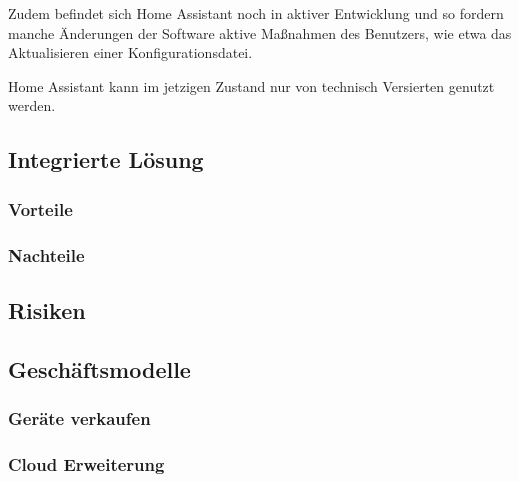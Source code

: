 Zudem befindet sich Home Assistant noch in aktiver Entwicklung und so fordern manche Änderungen der Software aktive Maßnahmen des Benutzers, wie etwa das Aktualisieren einer Konfigurationsdatei.

Home Assistant kann im jetzigen Zustand nur von technisch Versierten genutzt werden.

\subsection{Integrierte Lösung} %


\subsubsection{Vorteile}

\subsubsection{Nachteile}

\subsection{Risiken}


\subsection{Geschäftsmodelle}


\subsubsection{Geräte verkaufen} %


\subsubsection{Cloud Erweiterung} %

